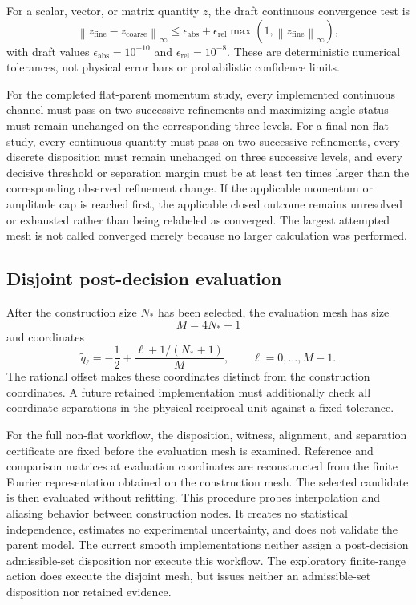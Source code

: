 \documentclass[11pt]{article}
\newcommand{\norm}[1]{\left\lVert #1\right\rVert}
\begin{document}
For a scalar, vector, or matrix quantity $z$, the draft continuous convergence test is
\begin{equation}
 \norm{z_{\mathrm{fine}}-z_{\mathrm{coarse}}}_\infty
 \le
 \epsilon_{\mathrm{abs}}
 +\epsilon_{\mathrm{rel}}
  \max\!\left(1,\norm{z_{\mathrm{fine}}}_\infty\right),
 \label{eq:convergence-test}
\end{equation}
with draft values
$\epsilon_{\mathrm{abs}}=10^{-10}$ and
$\epsilon_{\mathrm{rel}}=10^{-8}$. These are deterministic numerical tolerances, not
physical error bars or probabilistic confidence limits.

For the completed flat-parent momentum study, every implemented continuous channel must
pass on two successive refinements and maximizing-angle status must remain unchanged on
the corresponding three levels. For a final non-flat study, every continuous quantity must pass on two successive
refinements, every discrete disposition must remain unchanged on three successive
levels, and every decisive threshold or separation margin must be at least ten times
larger than the corresponding observed refinement change. If the applicable momentum or
amplitude cap is reached first, the applicable closed outcome remains unresolved or
exhausted rather than being relabeled as converged. The largest attempted mesh is not
called converged merely because no larger calculation was performed.

\subsection{Disjoint post-decision evaluation}

After the construction size $N_*$ has been selected, the evaluation mesh has size
\begin{equation}
 M=4N_*+1
 \label{eq:evaluation-size}
\end{equation}
and coordinates
\begin{equation}
 \widetilde q_\ell=-\frac12+
 \frac{\ell+1/(N_*+1)}{M},
 \qquad \ell=0,\ldots,M-1.
 \label{eq:evaluation-mesh}
\end{equation}
The rational offset makes these coordinates distinct from the construction coordinates.
A future retained implementation must additionally check all coordinate separations in
the physical reciprocal unit against a fixed tolerance.

For the full non-flat workflow, the disposition, witness, alignment, and
separation certificate are fixed before the evaluation mesh is examined. Reference and
comparison matrices at evaluation coordinates are reconstructed from the finite Fourier
representation obtained on the construction mesh. The selected candidate is then
evaluated without refitting. This procedure probes interpolation and aliasing behavior
between construction nodes. It creates no statistical independence, estimates no
experimental uncertainty, and does not validate the parent model. The current smooth
implementations neither assign a post-decision admissible-set disposition nor execute
this workflow. The exploratory finite-range action does execute the disjoint mesh, but
issues neither an admissible-set disposition nor retained evidence.
\end{document}
